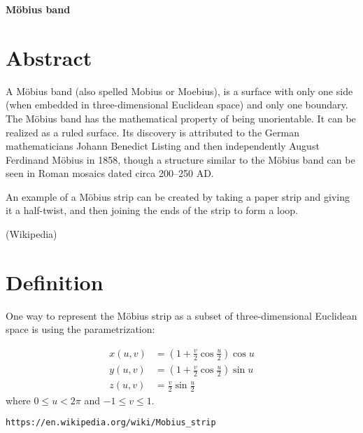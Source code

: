 \documentclass[12pt,dvipdfmx]{article}
\begin{document}
\begin{center}

{\bf \Large M\"{o}bius band}

\end{center}


\section{Abstract}
A M\"{o}bius band (also spelled Mobius or Moebius), is a surface with only one side (when embedded in three-dimensional Euclidean space) and only one boundary. The M\"{o}bius band has the mathematical property of being unorientable. It can be realized as a ruled surface. Its discovery is attributed to the German mathematicians Johann Benedict Listing and then independently August Ferdinand M\"{o}bius in 1858, though a structure similar to the M\"{o}bius band can be seen in Roman mosaics dated circa 200–250 AD.

An example of a M\"{o}bius strip can be created by taking a paper strip and giving it a half-twist, and then joining the ends of the strip to form a loop.

(Wikipedia)

\section{Definition}
One way to represent the M\"{o}bius strip as a subset of three-dimensional Euclidean space is using the parametrization:

\begin{align*}
 x(u,v)&=\left(1+{\frac {v}{2}}\cos {\frac {u}{2}}\right)\cos u \\
 y(u,v)&=\left(1+{\frac {v}{2}}\cos {\frac {u}{2}}\right)\sin u \\
 z(u,v)&=\frac {v}{2}\sin {\frac {u}{2}}
\end{align*}
where ${\displaystyle 0\leq u<2\pi }$ and ${\displaystyle -1\leq v\leq 1}$. 


\begin{thebibliography}{9}

  \verb|https://en.wikipedia.org/wiki/Mobius_strip|


\end{thebibliography}
\end{document}
